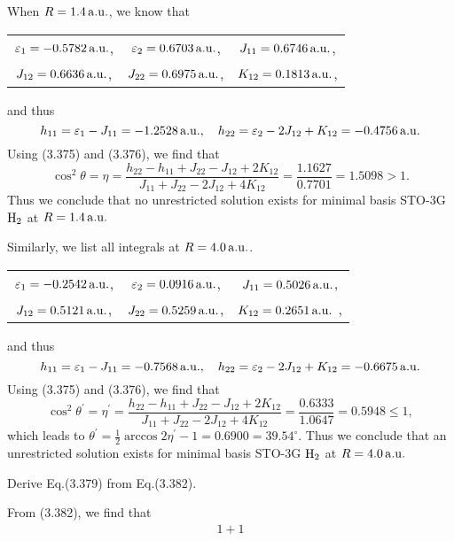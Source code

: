 \documentclass[a4paper]{book}
\newcounter{exercise}[chapter]
\newcounter{solution}[chapter]
\newcommand{\au}{{\rm a.u.}}
\begin{document}
	\begin{solution}
	
	When $R = 1.4 \, \au$, we know that
	\begin{center}
	\begin{tabular}{ccc}
		$\varepsilon_1 = -0.5782\,\au$, & $\varepsilon_2 = 0.6703\, \au$, & $J_{11} = 0.6746\,\au$, \\
		$J_{12} = 0.6636\,\au$, & $J_{22} = 0.6975\,\au$, & $K_{12} = 0.1813\,\au$,
	\end{tabular}
	\end{center}
	and thus
	\[
		h_{11} = \varepsilon_1 - J_{11} = -1.2528 \, \au , \quad h_{22} = \varepsilon_2 - 2J_{12} + K_{12} = -0.4756 \, \au 
	\]
	Using (3.375) and (3.376), we find that
	\[
		\cos^2 \theta = \eta = \frac{ h_{22} - h_{11} + J_{22} -J_{12} + 2 K_{12} }{ J_{11} + J_{22} - 2 J_{12} + 4 K_{12} } = \frac{ 1.1627 }{ 0.7701 } = 1.5098 > 1 .
	\]
	Thus we conclude that no unrestricted solution exists for minimal basis STO-3G $\ce{H2}$ at $R = 1.4 \, \au$
	
	Similarly, we list all integrals at $R = 4.0\, \au$.
	\begin{center}
	\begin{tabular}{ccc}
		$\varepsilon_1 = -0.2542\,\au$, & $\varepsilon_2 = 0.0916\, \au$, & $J_{11} = 0.5026\,\au$, \\
		$J_{12} = 0.5121\,\au$, & $J_{22} = 0.5259\,\au$, & $K_{12} = 0.2651\,\au$ ,
	\end{tabular}
	\end{center}
	and thus
	\[
		h_{11} = \varepsilon_1 - J_{11} = -0.7568 \, \au , \quad h_{22} = \varepsilon_2 - 2J_{12} + K_{12} = -0.6675 \, \au 
	\]
	Using (3.375) and (3.376), we find that
	\[
		\cos^2 \theta^\prime = \eta^\prime = \frac{ h_{22} - h_{11} + J_{22} -J_{12} + 2 K_{12} }{ J_{11} + J_{22} - 2 J_{12} + 4 K_{12} } = \frac{ 0.6333 }{ 1.0647 } = 0.5948 \le 1 ,
	\]
	which leads to $\theta^\prime = \frac{1}{2} \arccos{ 2 \eta^\prime - 1 } = 0.6900 = 39.54^\circ$. Thus we conclude that an unrestricted solution exists for minimal basis STO-3G $\ce{H2}$ at $R = 4.0 \, \au$
	
	\end{solution}
	
	\begin{exercise}
	Derive Eq.(3.379) from Eq.(3.382).
	\end{exercise}
	
	\begin{solution}
	
	From (3.382), we find that
	\begin{align*}
		1+1
	\end{align*}		
	
	\end{solution}
	
\end{document}
